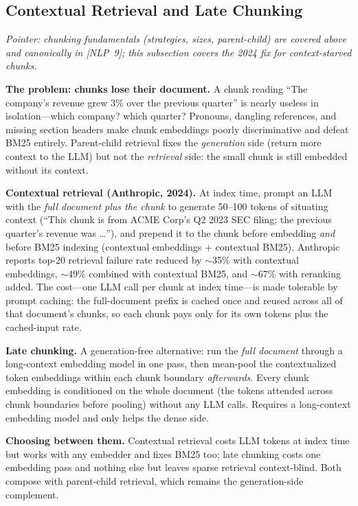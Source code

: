 \subsection{Contextual Retrieval and Late Chunking}

\textit{Pointer: chunking fundamentals (strategies, sizes, parent-child) are covered above and canonically in [NLP~9]; this subsection covers the 2024 fix for context-starved chunks.}

\textbf{The problem: chunks lose their document.} A chunk reading ``The company's revenue grew 3\% over the previous quarter'' is nearly useless in isolation---which company? which quarter? Pronouns, dangling references, and missing section headers make chunk embeddings poorly discriminative and defeat BM25 entirely. Parent-child retrieval fixes the \textit{generation} side (return more context to the LLM) but not the \textit{retrieval} side: the small chunk is still embedded without its context.

\textbf{Contextual retrieval (Anthropic, 2024).} At index time, prompt an LLM with the \textit{full document plus the chunk} to generate 50--100 tokens of situating context (``This chunk is from ACME Corp's Q2 2023 SEC filing; the previous quarter's revenue was \ldots''), and prepend it to the chunk before embedding \textit{and} before BM25 indexing (contextual embeddings + contextual BM25). Anthropic reports top-20 retrieval failure rate reduced by $\sim$35\% with contextual embeddings, $\sim$49\% combined with contextual BM25, and $\sim$67\% with reranking added. The cost---one LLM call per chunk at index time---is made tolerable by prompt caching: the full-document prefix is cached once and reused across all of that document's chunks, so each chunk pays only for its own tokens plus the cached-input rate.

\textbf{Late chunking.} A generation-free alternative: run the \textit{full document} through a long-context embedding model in one pass, then mean-pool the contextualized token embeddings within each chunk boundary \textit{afterwards}. Every chunk embedding is conditioned on the whole document (the tokens attended across chunk boundaries before pooling) without any LLM calls. Requires a long-context embedding model and only helps the dense side.

\textbf{Choosing between them.} Contextual retrieval costs LLM tokens at index time but works with any embedder and fixes BM25 too; late chunking costs one embedding pass and nothing else but leaves sparse retrieval context-blind. Both compose with parent-child retrieval, which remains the generation-side complement.

